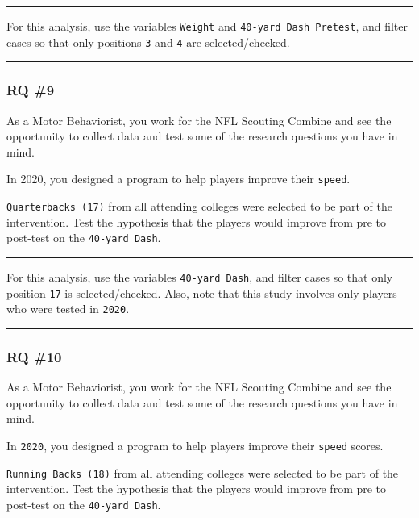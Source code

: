 \documentclass[
]{article}
\begin{document}
\begin{center}\rule{0.5\linewidth}{0.5pt}\end{center}

For this analysis, use the variables \texttt{Weight} and \texttt{40-yard\ Dash\ Pretest}, and filter cases so that only positions \texttt{3} and \texttt{4} are selected/checked.

\begin{center}\rule{0.5\linewidth}{0.5pt}\end{center}

\hypertarget{rq-9}{%
\subsubsection{RQ \#9}\label{rq-9}}

As a Motor Behaviorist, you work for the NFL Scouting Combine and see the opportunity to collect data and test some of the research questions you have in mind.

In 2020, you designed a program to help players improve their \texttt{speed}.

\texttt{Quarterbacks\ (17)} from all attending colleges were selected to be part of the intervention. Test the hypothesis that the players would improve from pre to post-test on the \texttt{40-yard\ Dash}.

\begin{center}\rule{0.5\linewidth}{0.5pt}\end{center}

For this analysis, use the variables \texttt{40-yard\ Dash}, and filter cases so that only position \texttt{17} is selected/checked. Also, note that this study involves only players who were tested in \texttt{2020}.

\begin{center}\rule{0.5\linewidth}{0.5pt}\end{center}

\hypertarget{rq-10}{%
\subsubsection{RQ \#10}\label{rq-10}}

As a Motor Behaviorist, you work for the NFL Scouting Combine and see the opportunity to collect data and test some of the research questions you have in mind.

In \texttt{2020}, you designed a program to help players improve their \texttt{speed} scores.

\texttt{Running\ Backs\ (18)} from all attending colleges were selected to be part of the intervention. Test the hypothesis that the players would improve from pre to post-test on the \texttt{40-yard\ Dash}.
\end{document}
